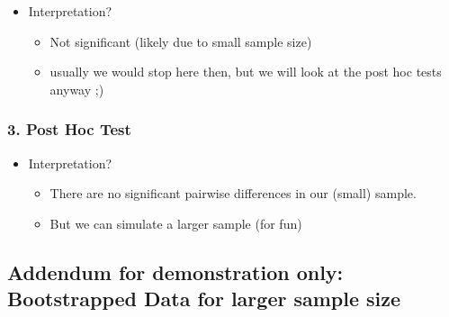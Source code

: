 \documentclass[
]{book}
\newenvironment{Shaded}{\begin{snugshade}}{\end{snugshade}}
\newcommand{\CommentTok}[1]{\textcolor[rgb]{0.56,0.35,0.01}{\textit{#1}}}
\newcommand{\FunctionTok}[1]{\textcolor[rgb]{0.13,0.29,0.53}{\textbf{#1}}}
\newcommand{\NormalTok}[1]{#1}
\providecommand{\tightlist}{%
  \setlength{\itemsep}{0pt}\setlength{\parskip}{0pt}}
\begin{document}
\begin{itemize}
\tightlist
\item
  Interpretation?

  \begin{itemize}
  \tightlist
  \item
    Not significant (likely due to small sample size)
  \item
    usually we would stop here then, but we will look at the post hoc tests anyway ;)
  \end{itemize}
\end{itemize}

\subsubsection*{3. Post Hoc Test}\label{post-hoc-test}

\begin{Shaded}
\end{Shaded}

\begin{itemize}
\tightlist
\item
  Interpretation?

  \begin{itemize}
  \tightlist
  \item
    There are no significant pairwise differences in our (small) sample.
  \item
    But we can simulate a larger sample (for fun)
  \end{itemize}
\end{itemize}

\subsection{Addendum for demonstration only: Bootstrapped Data for larger sample size}\label{addendum-for-demonstration-only-bootstrapped-data-for-larger-sample-size}
\end{document}
